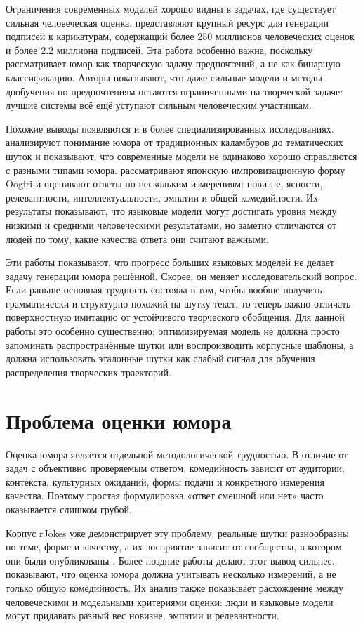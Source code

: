 Ограничения современных моделей хорошо видны в задачах, где существует сильная человеческая оценка. \citet{Zhang2024HumorAI} представляют крупный ресурс для генерации подписей к карикатурам, содержащий более 250 миллионов человеческих оценок и более 2.2 миллиона подписей. Эта работа особенно важна, поскольку рассматривает юмор как творческую задачу предпочтений, а не как бинарную классификацию. Авторы показывают, что даже сильные модели и методы дообучения по предпочтениям остаются ограниченными на творческой задаче: лучшие системы всё ещё уступают сильным человеческим участникам.

Похожие выводы появляются и в более специализированных исследованиях. \citet{loakman2025comparing} анализируют понимание юмора от традиционных каламбуров до тематических шуток и показывают, что современные модели не одинаково хорошо справляются с разными типами юмора. \citet{Sakabe2025} рассматривают японскую импровизационную форму Oogiri и оценивают ответы по нескольким измерениям: новизне, ясности, релевантности, интеллектуальности, эмпатии и общей комедийности. Их результаты показывают, что языковые модели могут достигать уровня между низкими и средними человеческими результатами, но заметно отличаются от людей по тому, какие качества ответа они считают важными.

Эти работы показывают, что прогресс больших языковых моделей не делает задачу генерации юмора решённой. Скорее, он меняет исследовательский вопрос. Если раньше основная трудность состояла в том, чтобы вообще получить грамматически и структурно похожий на шутку текст, то теперь важно отличать поверхностную имитацию от устойчивого творческого обобщения. Для данной работы это особенно существенно: оптимизируемая модель не должна просто запоминать распространённые шутки или воспроизводить корпусные шаблоны, а должна использовать эталонные шутки как слабый сигнал для обучения распределения творческих траекторий.

\section{Проблема оценки юмора}

Оценка юмора является отдельной методологической трудностью. В отличие от задач с объективно проверяемым ответом, комедийность зависит от аудитории, контекста, культурных ожиданий, формы подачи и конкретного измерения качества. Поэтому простая формулировка «ответ смешной или нет» часто оказывается слишком грубой.

Корпус rJokes уже демонстрирует эту проблему: реальные шутки разнообразны по теме, форме и качеству, а их восприятие зависит от сообщества, в котором они были опубликованы \citep{weller2020rjokes}. Более поздние работы делают этот вывод сильнее. \citet{Sakabe2025} показывают, что оценка юмора должна учитывать несколько измерений, а не только общую комедийность. Их анализ также показывает расхождение между человеческими и модельными критериями оценки: люди и языковые модели могут придавать разный вес новизне, эмпатии и релевантности.


